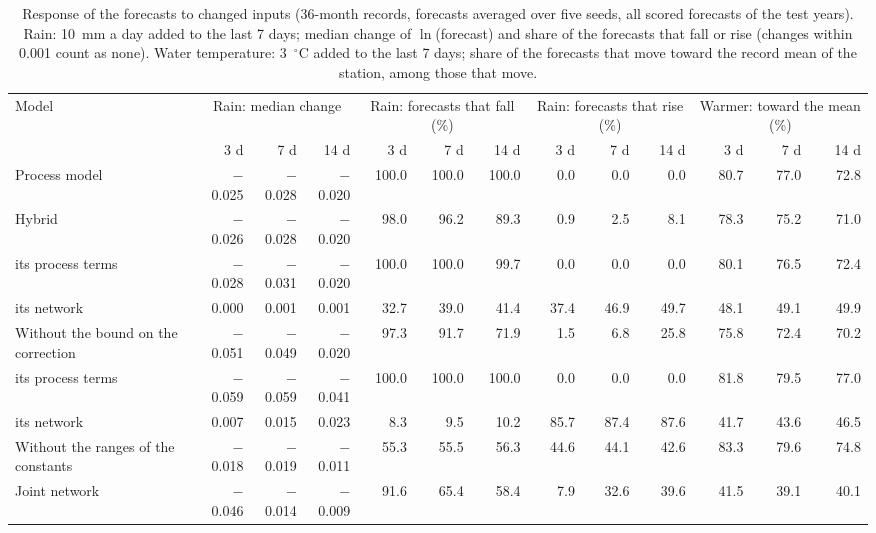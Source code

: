 \begin{table}[tbp]
\centering
\caption{Response of the forecasts to changed inputs (36-month records, forecasts averaged over five seeds, all scored forecasts of the test years). Rain: 10~mm a day added to the last 7 days; median change of $\ln$(forecast) and share of the forecasts that fall or rise (changes within 0.001 count as none). Water temperature: 3~$^\circ$C added to the last 7 days; share of the forecasts that move toward the record mean of the station, among those that move.}
\label{tab:S_response}
\footnotesize
\setlength{\tabcolsep}{3.5pt}
\begin{adjustbox}{max width=\textwidth}
\begin{tabular}{lrrrrrrrrrrrr}
\toprule
Model & \multicolumn{3}{c}{Rain: median change} & \multicolumn{3}{c}{Rain: forecasts that fall (\%)} & \multicolumn{3}{c}{Rain: forecasts that rise (\%)} & \multicolumn{3}{c}{Warmer: toward the mean (\%)} \\ \cmidrule(lr){2-4}\cmidrule(lr){5-7}\cmidrule(lr){8-10}\cmidrule(lr){11-13}
 & 3 d & 7 d & 14 d & 3 d & 7 d & 14 d & 3 d & 7 d & 14 d & 3 d & 7 d & 14 d \\
\midrule
Process model & $-$0.025 & $-$0.028 & $-$0.020 & 100.0 & 100.0 & 100.0 & 0.0 & 0.0 & 0.0 & 80.7 & 77.0 & 72.8 \\
Hybrid & $-$0.026 & $-$0.028 & $-$0.020 & 98.0 & 96.2 & 89.3 & 0.9 & 2.5 & 8.1 & 78.3 & 75.2 & 71.0 \\
\quad its process terms & $-$0.028 & $-$0.031 & $-$0.020 & 100.0 & 100.0 & 99.7 & 0.0 & 0.0 & 0.0 & 80.1 & 76.5 & 72.4 \\
\quad its network & 0.000 & 0.001 & 0.001 & 32.7 & 39.0 & 41.4 & 37.4 & 46.9 & 49.7 & 48.1 & 49.1 & 49.9 \\
Without the bound on the correction & $-$0.051 & $-$0.049 & $-$0.020 & 97.3 & 91.7 & 71.9 & 1.5 & 6.8 & 25.8 & 75.8 & 72.4 & 70.2 \\
\quad its process terms & $-$0.059 & $-$0.059 & $-$0.041 & 100.0 & 100.0 & 100.0 & 0.0 & 0.0 & 0.0 & 81.8 & 79.5 & 77.0 \\
\quad its network & 0.007 & 0.015 & 0.023 & 8.3 & 9.5 & 10.2 & 85.7 & 87.4 & 87.6 & 41.7 & 43.6 & 46.5 \\
Without the ranges of the constants & $-$0.018 & $-$0.019 & $-$0.011 & 55.3 & 55.5 & 56.3 & 44.6 & 44.1 & 42.6 & 83.3 & 79.6 & 74.8 \\
Joint network & $-$0.046 & $-$0.014 & $-$0.009 & 91.6 & 65.4 & 58.4 & 7.9 & 32.6 & 39.6 & 41.5 & 39.1 & 40.1 \\
\bottomrule
\end{tabular}
\end{adjustbox}
\end{table}
